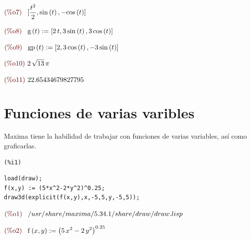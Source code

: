 \documentclass[12pt]{article}
\begin{document}
\begin{math}\displaystyle
\parbox{8ex}{\color{labelcolor}(\%o7) }
[\frac{{t}^{2}}{2},\mathrm{sin}\left( t\right) ,-\mathrm{cos}\left( t\right) ]
\end{math}

\begin{math}\displaystyle
\parbox{8ex}{\color{labelcolor}(\%o8) }
\mathrm{g}\left( t\right) :=[2\,t,3\,\mathrm{sin}\left( t\right) ,3\,\mathrm{cos}\left( t\right) ]
\end{math}

\begin{math}\displaystyle
\parbox{8ex}{\color{labelcolor}(\%o9) }
\mathrm{gp}\left( t\right) :=[2,3\,\mathrm{cos}\left( t\right) ,-3\,\mathrm{sin}\left( t\right) ]
\end{math}

\begin{math}\displaystyle
\parbox{8ex}{\color{labelcolor}(\%o10) }
2\,\sqrt{13}\,\pi 
\end{math}

\begin{math}\displaystyle
\parbox{8ex}{\color{labelcolor}(\%o11) }
22.65434679827795
\end{math}
\section{Funciones de varias varibles}
Maxima tiene la habilidad de trabajar con funciones de varias variables, así como graficarlas.
\noindent
\begin{minipage}[t]{8ex}{\color{red}\bf
\begin{verbatim}
(%i1) 
\end{verbatim}}
\end{minipage}
\begin{minipage}[t]{\textwidth}{\color{blue}
\begin{verbatim}
load(draw);
f(x,y) := (5*x^2-2*y^2)^0.25;
draw3d(explicit(f(x,y),x,-5,5,y,-5,5));
\end{verbatim}}
\end{minipage}

\begin{math}\displaystyle
\parbox{8ex}{\color{labelcolor}(\%o1) }
/usr/share/maxima/5.34.1/share/draw/draw.lisp
\end{math}

\begin{math}\displaystyle
\parbox{8ex}{\color{labelcolor}(\%o2) }
\mathrm{f}\left( x,y\right) :={\left( 5\,{x}^{2}-2\,{y}^{2}\right) }^{0.25}
\end{math}
\end{document}
